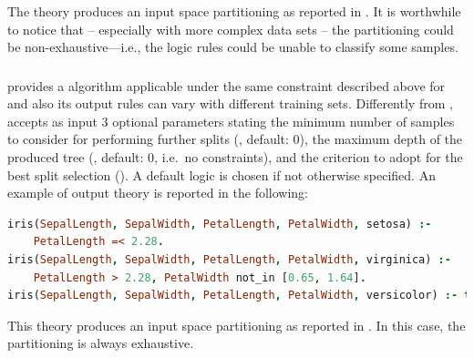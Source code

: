 \documentclass[12pt,a4paper,openright,twoside]{book}
\begin{document}
The theory produces an input space partitioning as reported in .
%
It is worthwhile to notice that -- especially with more complex data sets -- the partitioning could be non-exhaustive---i.e., the logic rules could be unable to classify some samples.

\subsubsection{\trepan{}}

\psyke{} provides a \trepan{} algorithm applicable under the same constraint described above for \real{} and also its output rules can vary with different training sets.
%
Differently from \real{}, \trepan{} accepts as input 3 optional parameters
%
stating the minimum number of samples to consider for performing further splits (, default: 0), the maximum depth of the produced tree (, default: 0, i.e.\ no constraints), and the criterion to adopt for the best split selection ().
%
A default logic is chosen if not otherwise specified.
%
An example of output theory is reported in the following:
%
\begin{lstlisting}[language=Prolog]
iris(SepalLength, SepalWidth, PetalLength, PetalWidth, setosa) :-
    PetalLength =< 2.28.
iris(SepalLength, SepalWidth, PetalLength, PetalWidth, virginica) :-
    PetalLength > 2.28, PetalWidth not_in [0.65, 1.64].
iris(SepalLength, SepalWidth, PetalLength, PetalWidth, versicolor) :- true.
\end{lstlisting}
%
This theory produces an input space partitioning as reported in .
%
In this case, the partitioning is always exhaustive.

\subsubsection{\cart{}}
\end{document}
